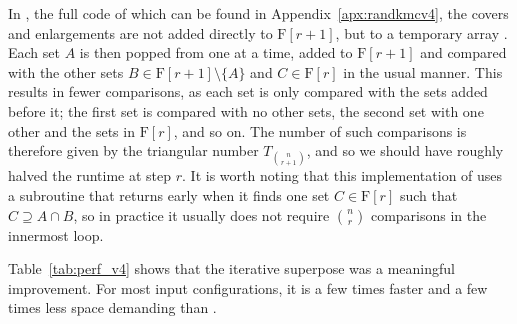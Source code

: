 In , the full code of which can be found in Appendix~\ref{apx:randkmcv4}, the covers and enlargements are not added directly to $\mathrm{F}[r+1]$, but to a temporary array . Each set $A$ is then popped from  one at a time, added to $\mathrm{F}[r+1]$ and compared with the other sets $B \in \mathrm{F}[r+1] \setminus \{A\}$ and $C \in \mathrm{F}[r]$ in the usual  manner. This results in fewer comparisons, as each set is only compared with the sets added before it; the first set is compared with no other sets, the second set with one other and the sets in $\mathrm{F}[r]$, and so on. The number of such comparisons is therefore given by the triangular number $T_{\binom{n}{r+1}}$, and so we should have roughly halved the runtime at step $r$. It is worth noting that this implementation of  uses a subroutine  that returns early when it finds one set $C \in \mathrm{F}[r]$ such that $C \supseteq A \cap B$, so in practice it usually does not require $\binom{n}{r}$ comparisons in the innermost loop.

Table~\ref{tab:perf_v4} shows that the iterative superpose was a meaningful improvement. For most input configurations, it is a few times faster and a few times less space demanding than .


